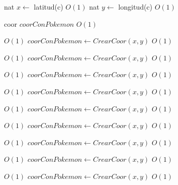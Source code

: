 \begin{Algoritmos}
\begin{algorithmic}[1]
\State nat $x \gets$ latitud(c)    \Comment $O(1)$
\State nat $y \gets$ longitud(c)   \Comment $O(1)$


\State coor $coorConPokemon$    \Comment $O(1)$

     \Comment $O(1)$
    \State $coorConPokemon \gets CrearCoor(x, y)$    \Comment $O(1)$
\EndIf

         \Comment $O(1)$
        \State $coorConPokemon \gets CrearCoor(x, y)$    \Comment $O(1)$
    \EndIf


             \Comment $O(1)$
            \State $coorConPokemon \gets CrearCoor(x, y)$    \Comment $O(1)$
        \EndIf

    \EndIf

             \Comment $O(1)$
            \State $coorConPokemon \gets CrearCoor(x, y)$    \Comment $O(1)$
        \EndIf
    \EndIf

             \Comment $O(1)$
            \State $coorConPokemon \gets CrearCoor(x, y)$    \Comment $O(1)$
        \EndIf
    \EndIf

\EndIf


         \Comment $O(1)$
        \State $coorConPokemon \gets CrearCoor(x, y)$    \Comment $O(1)$
    \EndIf


             \Comment $O(1)$
            \State $coorConPokemon \gets CrearCoor(x, y)$    \Comment $O(1)$
        \EndIf

    \EndIf

\EndIf


         \Comment $O(1)$
        \State $coorConPokemon \gets CrearCoor(x, y)$    \Comment $O(1)$
    \EndIf


             \Comment $O(1)$
            \State $coorConPokemon \gets CrearCoor(x, y)$    \Comment $O(1)$
        \EndIf



\end{algorithmic}
\end{Algoritmos}
